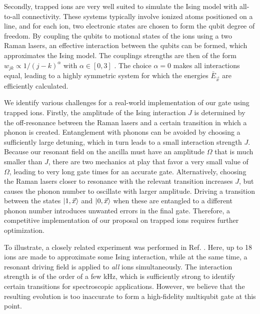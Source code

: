 Secondly, trapped ions are very well suited to simulate the Ising model with all-to-all connectivity. These systems typically involve ionized atoms positioned on a line, and for each ion, two electronic states are chosen to form the qubit degree of freedom. By coupling the qubits to motional states of the ions using a two Raman lasers, an effective interaction between the qubits can be formed, which approximates the Ising model. The couplings strengths are then of the form $w_{jk} \propto 1 / ( j - k )^\alpha$ with $\alpha \in [0,3]$ \cite{Kim2009,Blatt2012,Britton2012,Islam2013}. The choice $\alpha=0$ makes all interactions equal, leading to a highly symmetric system for which the energies $\bar{E}_{\vec{x}}$ are efficiently calculated. 

We identify various challenges for a real-world implementation of our gate using trapped ions. Firstly, the amplitude of the Ising interaction $J$ is determined by the off-resonance between the Raman lasers and a certain transition in which a phonon is created. Entanglement with phonons can be avoided by choosing a sufficiently large detuning, which in turn leads to a small interaction strength $J$. Because our resonant field on the ancilla must have an amplitude $\Omega$ that is much smaller than $J$, there are two mechanics at play that favor a very small value of $\Omega$, leading to very long gate times for an accurate gate. Alternatively, choosing the Raman lasers closer to resonance with the relevant transition increases $J$, but causes the phonon number to oscillate with larger amplitude. Driving a transition between the states $\lvert1,\vec{x}\rangle$ and $\lvert0,\vec{x}\rangle$ when these are entangled to a different phonon number introduces unwanted errors in the final gate. Therefore, a competitive implementation of our proposal on trapped ions requires further optimization. 

To illustrate, a closely related experiment was performed in Ref. \cite{Senko2014}. Here, up to 18 ions are made to approximate some Ising interaction, while at the same time, a resonant driving field is applied to \emph{all} ions simultaneously. The interaction strength is of the order of a few kHz, which is sufficiently strong to identify certain transitions for spectroscopic applications. However, we believe that the resulting evolution is too inaccurate to form a high-fidelity multiqubit gate at this point.


